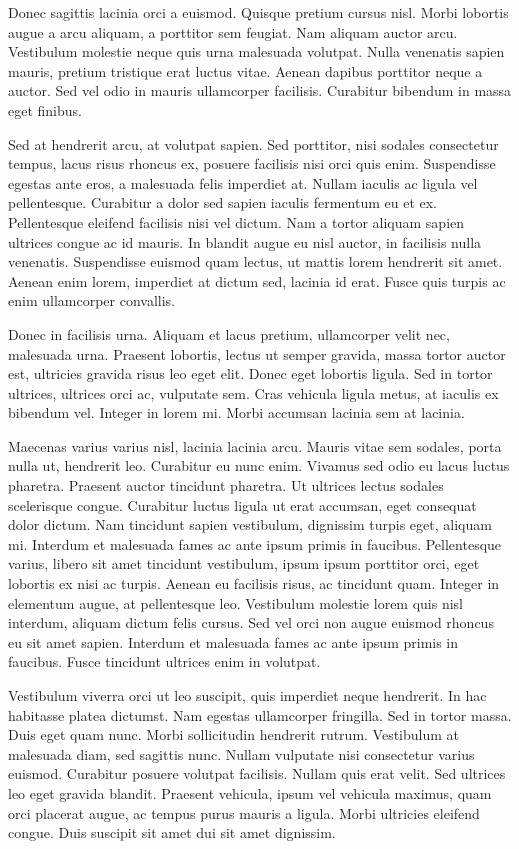 \documentclass{article}
\begin{document}
	Donec sagittis lacinia orci a euismod. Quisque pretium cursus nisl. Morbi lobortis augue a arcu aliquam, a porttitor sem feugiat. Nam aliquam auctor arcu. Vestibulum molestie neque quis urna malesuada volutpat. Nulla venenatis sapien mauris, pretium tristique erat luctus vitae. Aenean dapibus porttitor neque a auctor. Sed vel odio in mauris ullamcorper facilisis. Curabitur bibendum in massa eget finibus.
	
	Sed at hendrerit arcu, at volutpat sapien. Sed porttitor, nisi sodales consectetur tempus, lacus risus rhoncus ex, posuere facilisis nisi orci quis enim. Suspendisse egestas ante eros, a malesuada felis imperdiet at. Nullam iaculis ac ligula vel pellentesque. Curabitur a dolor sed sapien iaculis fermentum eu et ex. Pellentesque eleifend facilisis nisi vel dictum. Nam a tortor aliquam sapien ultrices congue ac id mauris. In blandit augue eu nisl auctor, in facilisis nulla venenatis. Suspendisse euismod quam lectus, ut mattis lorem hendrerit sit amet. Aenean enim lorem, imperdiet at dictum sed, lacinia id erat. Fusce quis turpis ac enim ullamcorper convallis.
	
	Donec in facilisis urna. Aliquam et lacus pretium, ullamcorper velit nec, malesuada urna. Praesent lobortis, lectus ut semper gravida, massa tortor auctor est, ultricies gravida risus leo eget elit. Donec eget lobortis ligula. Sed in tortor ultrices, ultrices orci ac, vulputate sem. Cras vehicula ligula metus, at iaculis ex bibendum vel. Integer in lorem mi. Morbi accumsan lacinia sem at lacinia.
	
	Maecenas varius varius nisl, lacinia lacinia arcu. Mauris vitae sem sodales, porta nulla ut, hendrerit leo. Curabitur eu nunc enim. Vivamus sed odio eu lacus luctus pharetra. Praesent auctor tincidunt pharetra. Ut ultrices lectus sodales scelerisque congue. Curabitur luctus ligula ut erat accumsan, eget consequat dolor dictum. Nam tincidunt sapien vestibulum, dignissim turpis eget, aliquam mi. Interdum et malesuada fames ac ante ipsum primis in faucibus. Pellentesque varius, libero sit amet tincidunt vestibulum, ipsum ipsum porttitor orci, eget lobortis ex nisi ac turpis. Aenean eu facilisis risus, ac tincidunt quam. Integer in elementum augue, at pellentesque leo. Vestibulum molestie lorem quis nisl interdum, aliquam dictum felis cursus. Sed vel orci non augue euismod rhoncus eu sit amet sapien. Interdum et malesuada fames ac ante ipsum primis in faucibus. Fusce tincidunt ultrices enim in volutpat.
	
	Vestibulum viverra orci ut leo suscipit, quis imperdiet neque hendrerit. In hac habitasse platea dictumst. Nam egestas ullamcorper fringilla. Sed in tortor massa. Duis eget quam nunc. Morbi sollicitudin hendrerit rutrum. Vestibulum at malesuada diam, sed sagittis nunc. Nullam vulputate nisi consectetur varius euismod. Curabitur posuere volutpat facilisis. Nullam quis erat velit. Sed ultrices leo eget gravida blandit. Praesent vehicula, ipsum vel vehicula maximus, quam orci placerat augue, ac tempus purus mauris a ligula. Morbi ultricies eleifend congue. Duis suscipit sit amet dui sit amet dignissim.
	
\end{document}
